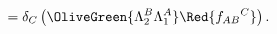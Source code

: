 \begin{equation}
  [\delta_A( \OliveGreen{\Lambda_1^A}),\delta_B(\OliveGreen{\Lambda_2^B})] =\delta_C\left(
\OliveGreen{\Lambda_2^B\Lambda_1^A} \Red{f_{AB}{}^C}\right).
 \label{commutator}
\end{equation}


